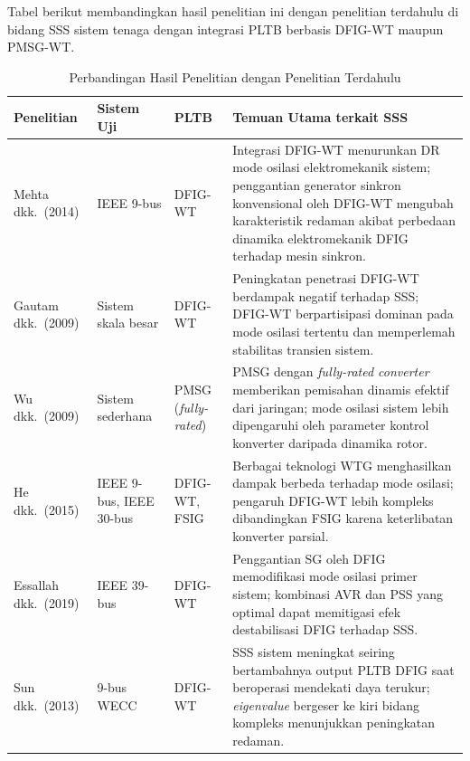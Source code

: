 Tabel berikut membandingkan hasil penelitian ini dengan penelitian terdahulu
di bidang SSS sistem tenaga dengan integrasi PLTB berbasis DFIG-WT maupun
PMSG-WT.

\begin{table}[H]
	\caption{Perbandingan Hasil Penelitian dengan Penelitian Terdahulu}
	\vspace{0.5em}
	\centering
	\fontsize{10}{12}\selectfont
	\setlength{\tabcolsep}{4pt}
	\begin{tabularx}{\linewidth}{p{2.8cm} p{1.9cm} p{1.9cm} X}
		\toprule
		\textbf{Penelitian} &
		\textbf{Sistem Uji} &
		\textbf{PLTB} &
		\textbf{Temuan Utama terkait SSS} \\
		\midrule
		Mehta dkk.\ (2014) \cite{mehta2014} &
		IEEE 9-bus &
		DFIG-WT &
		Integrasi DFIG-WT menurunkan DR mode osilasi elektromekanik sistem; penggantian generator sinkron konvensional oleh DFIG-WT mengubah karakteristik redaman akibat perbedaan dinamika elektromekanik DFIG terhadap mesin sinkron. \\
		\addlinespace
		Gautam dkk.\ (2009) \cite{gautam2009impact} &
		Sistem skala besar &
		DFIG-WT &
		Peningkatan penetrasi DFIG-WT berdampak negatif terhadap SSS; DFIG-WT berpartisipasi dominan pada mode osilasi tertentu dan memperlemah stabilitas transien sistem. \\
		\addlinespace
		Wu dkk.\ (2009) \cite{wu2009small} &
		Sistem sederhana &
		PMSG (\textit{fully-rated}) &
		PMSG dengan \textit{fully-rated converter} memberikan pemisahan dinamis efektif dari jaringan; mode osilasi sistem lebih dipengaruhi oleh parameter kontrol konverter daripada dinamika rotor. \\
		\addlinespace
		He dkk.\ (2015) \cite{he2015investigation} &
		IEEE 9-bus, IEEE 30-bus &
		DFIG-WT, FSIG &
		Berbagai teknologi WTG menghasilkan dampak berbeda terhadap mode osilasi; pengaruh DFIG-WT lebih kompleks dibandingkan FSIG karena keterlibatan konverter parsial. \\
		\addlinespace
		Essallah dkk.\ (2019) \cite{essallah2019} &
		IEEE 39-bus &
		DFIG-WT &
		Penggantian SG oleh DFIG memodifikasi mode osilasi primer sistem; kombinasi AVR dan PSS yang optimal dapat memitigasi efek destabilisasi DFIG terhadap SSS. \\
		\addlinespace
		Sun dkk.\ (2013) \cite{sun2013small} &
		9-bus WECC &
		DFIG-WT &
		SSS sistem meningkat seiring bertambahnya output PLTB DFIG saat beroperasi mendekati daya terukur; \textit{eigenvalue} bergeser ke kiri bidang kompleks menunjukkan peningkatan redaman. \\

\end{tabularx}
\end{table}
